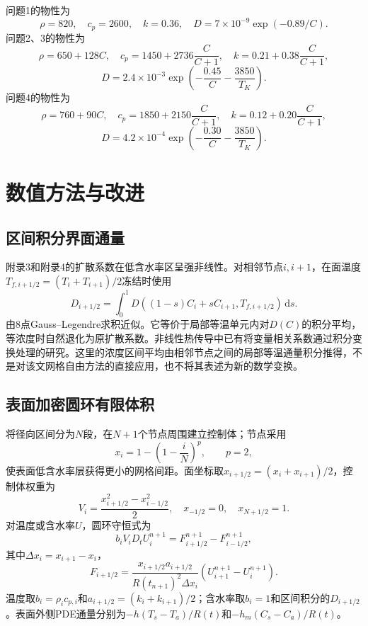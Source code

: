 \documentclass[UTF8,12pt,a4paper]{ctexart}
\newcommand{\dd}{\,\mathrm d}
\begin{document}
问题1的物性为
\begin{equation}
\rho=820,\quad c_p=2600,\quad k=0.36,\quad D=7\times10^{-9}\exp(-0.89/C).
\end{equation}
问题2、3的物性为
\begin{equation}
\rho=650+128C,\quad c_p=1450+2736\frac{C}{C+1},\quad k=0.21+0.38\frac{C}{C+1},
\end{equation}
\begin{equation}
D=2.4\times10^{-3}\exp\left(-\frac{0.45}{C}-\frac{3850}{T_K}\right).
\end{equation}
问题4的物性为
\begin{equation}
\rho=760+90C,\quad c_p=1850+2150\frac{C}{C+1},\quad k=0.12+0.20\frac{C}{C+1},
\end{equation}
\begin{equation}
D=4.2\times10^{-4}\exp\left(-\frac{0.30}{C}-\frac{3850}{T_K}\right).
\end{equation}

\section{数值方法与改进}
\subsection{区间积分界面通量}
附录3和附录4的扩散系数在低含水率区呈强非线性。对相邻节点$i,i+1$，在面温度$T_{f,i+1/2}=(T_i+T_{i+1})/2$冻结时使用
\begin{equation}
D_{i+1/2}=\int_0^1D((1-s)C_i+sC_{i+1},T_{f,i+1/2})\dd s.
\end{equation}
由8点Gauss--Legendre求积近似。它等价于局部等温单元内对$D(C)$的积分平均，等浓度时自然退化为原扩散系数。非线性热传导中已有将变量相关系数通过积分变换处理的研究\cite{stevens2010}。这里的浓度区间平均由相邻节点之间的局部等温通量积分推得，不是对该文网格自由方法的直接应用，也不将其表述为新的数学变换。

\subsection{表面加密圆环有限体积}
将径向区间分为$N$段，在$N+1$个节点周围建立控制体；节点采用
\begin{equation}
x_i=1-\left(1-\frac{i}{N}\right)^p,\qquad p=2,
\end{equation}
使表面低含水率层获得更小的网格间距。面坐标取$x_{i+1/2}=(x_i+x_{i+1})/2$，控制体权重为
\begin{equation}
V_i=\frac{x_{i+1/2}^2-x_{i-1/2}^2}{2},\quad x_{-1/2}=0,\quad x_{N+1/2}=1.
\end{equation}
对温度或含水率$U$，圆环守恒式为
\begin{equation}
b_iV_i D_t U_i^{n+1}=F_{i+1/2}^{n+1}-F_{i-1/2}^{n+1},
\end{equation}
其中$\Delta x_i=x_{i+1}-x_i$，
\begin{equation}
F_{i+1/2}=\frac{x_{i+1/2}a_{i+1/2}}{R(t_{n+1})^2\Delta x_i}(U_{i+1}^{n+1}-U_i^{n+1}).
\end{equation}
温度取$b_i=\rho_ic_{p,i}$和$a_{i+1/2}=(k_i+k_{i+1})/2$；含水率取$b_i=1$和区间积分的$D_{i+1/2}$。表面外侧PDE通量分别为$-h(T_s-T_a)/R(t)$和$-h_m(C_s-C_a)/R(t)$。
\end{document}
